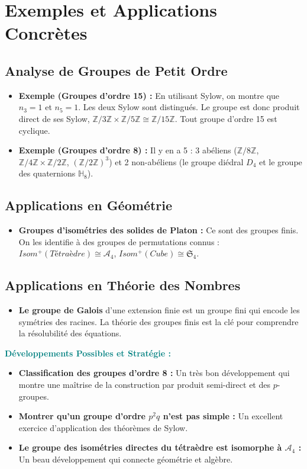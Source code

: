 \documentclass[12pt, a4paper, parskip=full]{report}
\theoremstyle{agregstyle}
\newenvironment{developpements}
  {\par\medskip\noindent\begin{oframed}\noindent\textbf{\textcolor{teal}{Développements Possibles et Stratégie :}}}
  {\end{oframed}\par\medskip}
\begin{document}
\section{Exemples et Applications Concrètes}
\subsection{Analyse de Groupes de Petit Ordre}
\begin{itemize}
    \item \textbf{Exemple (Groupes d'ordre 15) :} En utilisant Sylow, on montre que $n_3=1$ et $n_5=1$. Les deux Sylow sont distingués. Le groupe est donc produit direct de ses Sylow, $\mathbb{Z}/3\mathbb{Z} \times \mathbb{Z}/5\mathbb{Z} \cong \mathbb{Z}/15\mathbb{Z}$. Tout groupe d'ordre 15 est cyclique.
    \item \textbf{Exemple (Groupes d'ordre 8) :} Il y en a 5 : 3 abéliens ($\mathbb{Z}/8\mathbb{Z}$, $\mathbb{Z}/4\mathbb{Z} \times \mathbb{Z}/2\mathbb{Z}$, $(\mathbb{Z}/2\mathbb{Z})^3$) et 2 non-abéliens (le groupe diédral $D_4$ et le groupe des quaternions $\mathbb{H}_8$).
\end{itemize}
\subsection{Applications en Géométrie}
\begin{itemize}
    \item \textbf{Groupes d'isométries des solides de Platon :} Ce sont des groupes finis. On les identifie à des groupes de permutations connus : $Isom^+(Tétraèdre) \cong \mathcal{A}_4$, $Isom^+(Cube) \cong \mathfrak{S}_4$.
\end{itemize}
\subsection{Applications en Théorie des Nombres}
\begin{itemize}
    \item \textbf{Le groupe de Galois} d'une extension finie est un groupe fini qui encode les symétries des racines. La théorie des groupes finis est la clé pour comprendre la résolubilité des équations.
\end{itemize}

\begin{developpements}
    \begin{itemize}
        \item \textbf{Classification des groupes d'ordre 8 :} Un très bon développement qui montre une maîtrise de la construction par produit semi-direct et des $p$-groupes.
        \item \textbf{Montrer qu'un groupe d'ordre $p^2q$ n'est pas simple :} Un excellent exercice d'application des théorèmes de Sylow.
        \item \textbf{Le groupe des isométries directes du tétraèdre est isomorphe à $\mathcal{A}_4$ :} Un beau développement qui connecte géométrie et algèbre.
    \end{itemize}
\end{developpements}
\end{document}
